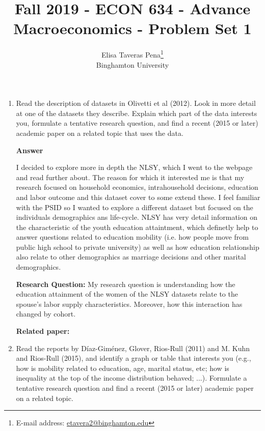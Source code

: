 \documentclass[12pt]{article}%
\begin{document}
\title{Fall 2019 - ECON 634 - Advance Macroeconomics - Problem Set 1}
\author{Elisa Taveras Pena\footnote{E-mail address: \href{mailto:etavera2@binghamton.edu}{etavera2@binghamton.edu}  }\\
Binghamton University}
\maketitle

\sloppy%

\onehalfspacing

\begin{enumerate}
	\item Read the description of datasets in Olivetti et al (2012). Look in more detail at one of the datasets they describe. Explain which part of the data interests you, formulate a tentative research question, and find a recent (2015 or later) academic paper on a related topic that uses the data.
	    	\vspace{3mm}
	
	{\bf Answer}   	
	
	\vspace{3mm}
	
	I decided to explore more in depth the NLSY, which I went to the webpage and read further about. The reason for which it interested me is that my research focused on household economics, intrahousehold decisions, education and labor outcome and this dataset cover to some extend these. I feel familiar with the PSID so I wanted to explore a different dataset but focused on the individuals demographics ans life-cycle. NLSY has very detail information on the characteristic of the youth education attaintment, which definetly help to answer questions related to education mobility (i.e. how people move from public high school to private university) as well as how education relationship also relate to other demographics as marriage decisions and other marital demographics.
	
	\textbf{Research Question:}
	My research question is understanding how the education attainment of the women of the NLSY datasets relate to the spouse's labor supply characteristics. Moreover, how this interaction has changed by cohort. 
	
	\textbf{Related paper:}
	
	
	\item Read the reports by Díaz-Giménez, Glover, Rios-Rull (2011) and M. Kuhn and Rios-Rull (2015), and identify a graph or table that interests you
	(e.g., how is mobility related to education, age, marital status, etc; how is inequality at the top of the income distribution behaved; ...). Formulate a tentative research question and find a recent (2015 or later) academic  paper on a related topic.
	

\end{enumerate}
\end{document}

